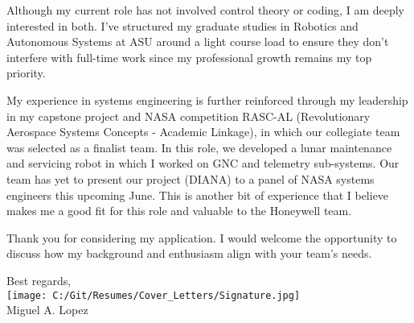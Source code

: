 \documentclass[11pt]{letter}
\newcommand{\mysignature}{Miguel A. Lopez}
\begin{document}
	Although my current role has not involved control theory or coding, I am deeply interested in both. I’ve structured my graduate studies in Robotics and Autonomous Systems at ASU around a light course load to ensure they don’t interfere with full-time work since my professional growth remains my top priority.

	My experience in systems engineering is further reinforced through my leadership in my capstone project and NASA competition RASC-AL (Revolutionary Aerospace Systems Concepts - Academic Linkage), in which our collegiate team was selected as a finalist team. In this role, we developed a lunar maintenance and servicing robot in which I worked on GNC and telemetry sub-systems. Our team has yet to present our project (DIANA) to a panel of NASA systems engineers this upcoming June. This is another bit of experience that I believe makes me a good fit for this role and valuable to the Honeywell team.
	
	Thank you for considering my application. I would welcome the opportunity to discuss how my background and enthusiasm align with your team’s needs.
	
	Best regards,\\[0ex]
	\texttt{[image: C:/Git/Resumes/Cover\_Letters/Signature.jpg]}\\ 
	\mysignature
	
\end{document}
